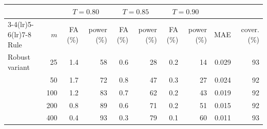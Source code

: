 \begin{tabular*}{\tblwidth}{@{\extracolsep{\fill}}lrrrrrrrrr@{}}
\toprule
 & & \multicolumn{2}{c}{$T=0.80$} & \multicolumn{2}{c}{$T=0.85$} & \multicolumn{2}{c}{$T=0.90$} & & \\
\cmidrule(lr){3-4}\cmidrule(lr){5-6}\cmidrule(lr){7-8}
Rule & $m$ & FA (\%) & power (\%) & FA (\%) & power (\%) & FA (\%) & power (\%) & MAE & cover. (\%) \\
\midrule
Robust variant & 25 & 1.4 & 58 & 0.6 & 28 & 0.2 & 14 & 0.029 & 93 \\
 & 50 & 1.7 & 72 & 0.8 & 47 & 0.3 & 27 & 0.024 & 92 \\
 & 100 & 1.2 & 83 & 0.7 & 62 & 0.2 & 43 & 0.019 & 92 \\
 & 200 & 0.8 & 89 & 0.6 & 71 & 0.2 & 51 & 0.015 & 92 \\
 & 400 & 0.4 & 93 & 0.3 & 79 & 0.1 & 60 & 0.011 & 93 \\
\bottomrule
\end{tabular*}
